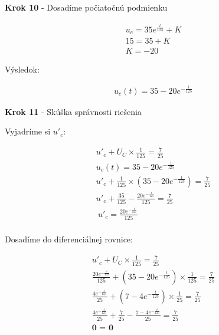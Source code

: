 \begin{center}
    \textbf{Krok 10} - Dosadíme počiatočnú podmienku
\end{center}

\begin{gather*}
   u_{c} = 35e^{\frac{t}{125}} + K \\
   15 = 35 + K \\
    K = - 20
\end{gather*}


Výsledok:

\begin{gather*}
	u_{c}(t) = 35-20e^{-\frac{1}{125}}
\end{gather*}

\begin{center}
    \textbf{Krok 11} - Skúška správnosti riešenia 
\end{center}

Vyjadríme si $u'_c$:

\begin{gather*}
    u'_{c} + U_{C} \times \frac {1} {125} = \frac {7} {25} \\
    u_{c}(t) = 35-20e^{-\frac{1}{125}} \\
    u'_{c} + \frac{1}{125} \times (35-20e^{-\frac{1}{125}}) = \frac {7} {25}\\
    u'_{c} + \frac {35}{125} - \frac {20e^{- \frac {t}{125}}} {125} = \frac {7} {25} \\\
    u'_{c} = \frac {20e^{- \frac {t}{125}}} {125} \\
\end{gather*}

Dosadíme do diferenciálnej rovnice:
 
\begin{gather*}
    u'_{c} + U_{C} \times \frac {1} {125} = \frac {7} {25} \\
    \frac {20e^{- \frac {t}{125}}} {125} + (35-20e^{-\frac{t}{125}}) \times \frac {1}{125} = \frac {7}{25} \\
    \frac {4e^{- \frac {t}{125}}} {25} + (7-4e^{-\frac{t}{125}}) \times \frac {1}{25} = \frac {7}{25} \\
    \frac {4e^{- \frac {t}{125}}} {25} + \frac {7}{25} - \frac {7-4e^{-\frac{t}{125}}} {25} = \frac {7}{25} \\
    \textbf{0 = 0} \\
\end{gather*}


